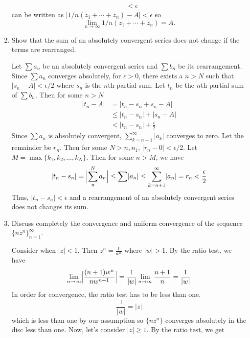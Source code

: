 \begin{enumerate}
\begin{align*}
    & < \epsilon
  \end{align*}
   can be written as
  \(\lvert 1/n(z_1 + \cdots + z_n) - A\rvert < \epsilon\) so
  \[
  \lim_{n\to\infty}1/n(z_1 + \cdots + z_n) = A.
  \]
\item
  Show that the sum of an absolutely convergent series does not change if the
  terms are rearranged.
  \par\smallskip
  Let \(\sum a_n\) be an absolutely convergent series and \(\sum b_n\) be its
  rearrangement.
  Since \(\sum a_n\) converges absolutely, for \(\epsilon > 0\), there exists
  a \(n > N\) such that \(\lvert s_n - A\rvert < \epsilon/2\) where \(s_n\) is
  the \(n\)th partial sum.
  Let \(t_n\) be the \(n\)th partial sum of \(\sum b_n\).
  Then for some \(n > N\)
  \begin{align*}
    \lvert t_n - A\rvert & = \lvert t_n - s_n + s_n - A\rvert\\
                         & \leq \lvert t_n - s_n\rvert + \lvert s_n - A\rvert\\
                         & < \lvert t_n - s_n\rvert + \frac{\epsilon}{2}
  \end{align*}
  Since \(\sum a_n\) is absolutely convergent,
  \(\sum_{k = n + 1}^{\infty}\lvert a_k\rvert\) converges to zero.
  Let the remainder be \(r_n\).
  Then for some \(N > n,n_1\), \(\lvert r_n - 0\rvert < \epsilon/2\).
  Let \(M = \max\{k_1,k_2,\ldots,k_N\}\).
  Then for some \(n > M\), we have
  \[
  \lvert t_n - s_n\rvert = \Bigl\lvert\sum_n^N a_n\Bigr\rvert\leq
  \sum\lvert a_n\rvert\leq\sum_{k = n + 1}^{\infty}\lvert a_n\rvert = r_n <
  \frac{\epsilon}{2}
  \]
  Thus, \(\lvert t_n - s_n\rvert < \epsilon\) and a rearrangement of an
  absolutely convergent series does not changes its sum.
\item
  Discuss completely the convergence and uniform convergence of the sequence
  \(\{nz^n\}_{n = 1}^{\infty}\).
  \par\smallskip
  Consider when \(\lvert z\rvert < 1\).
  Then \(z^n = \frac{1}{w^n}\) where \(\lvert w\rvert > 1\).
  By the ratio test, we have
  \[
  \lim_{n\to\infty}\Bigl\lvert\frac{(n + 1)w^n}{nw^{n + 1}}\Bigr\rvert =
  \frac{1}{\lvert w\rvert}\lim_{n\to\infty}\frac{n + 1}{n} =
  \frac{1}{\lvert w\rvert}
  \]
  In order for convergence, the ratio test has to be less than one.
  \[
  \frac{1}{\lvert w\rvert} = \lvert z\rvert
  \]
  which is less than one by our assumption so \(\{nz^n\}\) converges
  absolutely in the disc less than one.
  Now, let's consider \(\lvert z\rvert\geq 1\).
  By the ratio test, we get

\end{enumerate}

